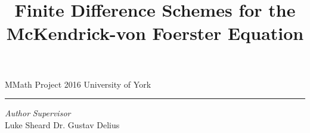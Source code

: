\documentclass[11pt, a4paper]{report}
\title{Finite Difference Schemes for the McKendrick-von Foerster Equation}
\makeatletter
\def\printtitle{%
  \textcolor{white}{\fontsize{32px}{3cm}\selectfont \@title}}
\theoremstyle{definition}
\theoremstyle{plain}
\makeatother
\begin{document}
  \def\biblio{}
  \raggedright
  \allowdisplaybreaks

  \begin{titlepage}
    \BgThispage
    \vspace*{0.3\textheight}
    \noindent
    \printtitle
    \vspace*{2cm}\par
    \begin{minipage}{1.1\linewidth}
      \begin{minipage}[c]{0.25\linewidth}
        \begin{flushright}
          MMath Project 2016
          University of York
        \end{flushright}
      \end{minipage} \hspace{15pt}
      \begin{minipage}{0.02\linewidth}
        \rule{1pt}{225pt}
      \end{minipage} \hspace{25pt}
      \begin{minipage}[c]{0.73\linewidth}
        \textit{Author}   \hfill   \textit{Supervisor} \\
        Luke Sheard       \hfill   Dr. Gustav Delius
      \end{minipage}
    \end{minipage}
    \noindent
  \end{titlepage}
  \restoregeometry

  \onehalfspacing

  

  

  

  

  

  \begin{appendix}
  \end{appendix}

  \newpage
  
  
\end{document}
